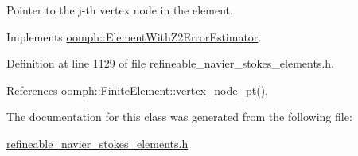 Pointer to the j-\/th vertex node in the element. 



Implements \hyperlink{classoomph_1_1ElementWithZ2ErrorEstimator_a0eedccc33519f852c5dc2055ddf2774b}{oomph\+::\+Element\+With\+Z2\+Error\+Estimator}.



Definition at line 1129 of file refineable\+\_\+navier\+\_\+stokes\+\_\+elements.\+h.



References oomph\+::\+Finite\+Element\+::vertex\+\_\+node\+\_\+pt().



The documentation for this class was generated from the following file\+:\begin{DoxyCompactItemize}
\item 
\hyperlink{refineable__navier__stokes__elements_8h}{refineable\+\_\+navier\+\_\+stokes\+\_\+elements.\+h}\end{DoxyCompactItemize}
